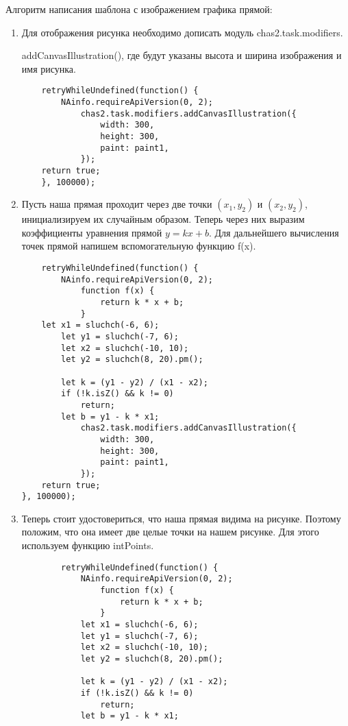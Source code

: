 Алгоритм написания шаблона с изображением графика прямой:
\begin{enumerate}
    \item Для отображения рисунка необходимо дописать модуль chas2.task.modifiers.

          addCanvasIllustration(), где будут указаны высота и ширина изображения и имя рисунка.
          \begin{verbatim}
    retryWhileUndefined(function() {
	    NAinfo.requireApiVersion(0, 2);
            chas2.task.modifiers.addCanvasIllustration({
                width: 300,
                height: 300,
                paint: paint1,
            });
    return true;
    }, 100000);
    \end{verbatim}
    \item Пусть наша прямая проходит через две точки $(x_1,y_2)$ и $(x_2,y_2)$, инициализируем их случайным образом. Теперь через них выразим коэффициенты уравнения прямой $y=kx+b$.
          Для дальнейшего вычисления точек прямой напишем вспомогательную функцию f(x).
          \begin{verbatim}
    retryWhileUndefined(function() {
	    NAinfo.requireApiVersion(0, 2);
            function f(x) {
                return k * x + b;
            }
    let x1 = sluchch(-6, 6);
	    let y1 = sluchch(-7, 6);
	    let x2 = sluchch(-10, 10);
	    let y2 = sluchch(8, 20).pm();

	    let k = (y1 - y2) / (x1 - x2);
	    if (!k.isZ() && k != 0)
		    return;
	    let b = y1 - k * x1;
            chas2.task.modifiers.addCanvasIllustration({
                width: 300,
                height: 300,
                paint: paint1,
            });
	return true;
}, 100000);
    \end{verbatim}
    \item Теперь стоит удостовериться, что наша прямая видима на рисунке.
          Поэтому положим, что она имеет две целые точки на нашем рисунке. Для этого используем функцию intPoints.
          \begin{verbatim}
        retryWhileUndefined(function() {
            NAinfo.requireApiVersion(0, 2);
                function f(x) {
                    return k * x + b;
                }
            let x1 = sluchch(-6, 6);
            let y1 = sluchch(-7, 6);
            let x2 = sluchch(-10, 10);
            let y2 = sluchch(8, 20).pm();
    
            let k = (y1 - y2) / (x1 - x2);
            if (!k.isZ() && k != 0)
                return;
            let b = y1 - k * x1;


\end{verbatim}
\end{enumerate}
